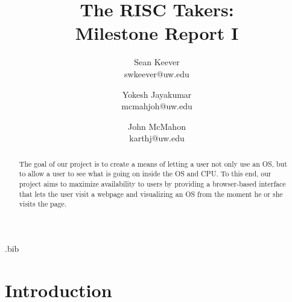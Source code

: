 \usepackage{filecontents}

\usepackage{graphicx}
\usepackage{float}
\graphicspath{ {../images/}}

\begin{filecontents}{\jobname.bib}

\end{filecontents}



\date{}

\title{\Large \bf The RISC Takers:\\
  Milestone Report I}

\author{
  {\rm Sean Keever} \\
  swkeever@uw.edu
  \and
  {\rm Yokesh Jayakumar} \\
  mcmahjoh@uw.edu
  \and
  {\rm John McMahon} \\
  karthj@uw.edu
} %

\maketitle

\begin{abstract}
  The goal of our project is to create a means of letting a user not only use an OS,
  but to allow a user to see what is going on inside the OS and CPU.
  To this end, our project aims to maximize availability to users by
  providing a browser-based interface that lets the user visit a webpage and
  visualizing an OS from the moment he or she visits the page.
\end{abstract}

\section{Introduction}

